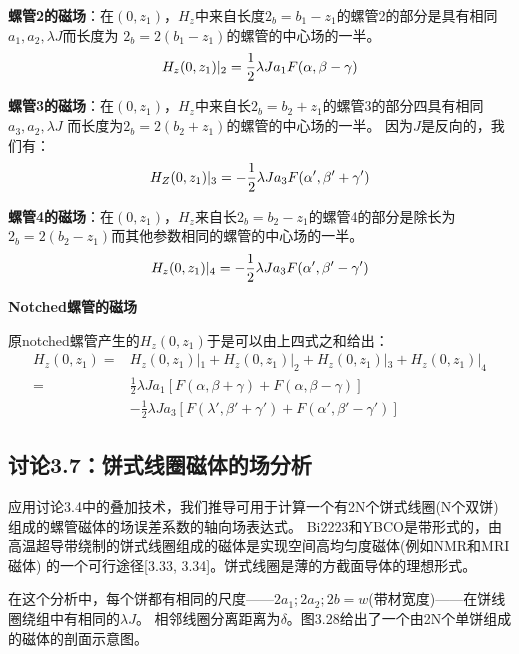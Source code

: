 \textbf{螺管2的磁场}：在$(0, z_1)$，$H_z$中来自长度$2_b = b_1−z_1$的螺管2的部分是具有相同$a_1, a_2,\lambda J$而长度为
$2_b = 2(b_1−z_1)$的螺管的中心场的一半。
\begin{equation}
H_{z}(0,z_{1})|_{2}=\frac{1}{2}\lambda Ja_{1}F(\alpha,\beta-\gamma)\\%
\end{equation}

\textbf{螺管3的磁场}：在$(0, z_1)$，$H_z$中来自长$2_b=b_2+z_1$的螺管3的部分四具有相同$a_3, a_2,\lambda J$
而长度为$2_b=2(b_2+z_1)$的螺管的中心场的一半。
因为$J$是反向的，我们有：
\begin{equation}
H_{Z}(0,z_{1})|_{3}=-\frac{1}{2}\lambda Ja_{3}F(\alpha',\beta'+\gamma')\\%
\end{equation}

\textbf{螺管4的磁场}：在$(0, z_1)$，$H_z$来自长$2_b = b_2−z_1$的螺管4的部分是除长为$2_b = 2(b_2−z_1)$而其他参数相同的螺管的中心场的一半。
\begin{equation}
H_{z}(0,z_{1})|_{4}=-\frac{1}{2}\lambda Ja_{3}F(\alpha',\beta'-\gamma')\\%
\end{equation}

\textbf{Notched螺管的磁场}

原notched螺管产生的$H_z(0,z_1)$于是可以由上四式之和给出：
\begin{equation}%
\begin{split}
 H_{z}(0,z_{1}) =&H_{z}(0,z_{1})|_{1}+H_{z}(0,z_{1})|_{2}+H_{z}(0,z_{1})|_{3}+H_{z}(0,z_{1})|_{4} \\
=&\frac{1}{2}\lambda J a_{1}[F(\alpha,\beta+\gamma)+F(\alpha,\beta-\gamma)] \\%
&-\frac{1}{2}\lambda J a_{3}[F(\lambda',\beta'+\gamma')+F(\alpha',\beta'-\gamma')]
\end{split}
\end{equation}
\newpage


\subsection{讨论3.7：饼式线圈磁体的场分析}
应用讨论3.4中的叠加技术，我们推导可用于计算一个有2N个饼式线圈(N个双饼)组成的螺管磁体的场误差系数的轴向场表达式。
Bi2223和YBCO是带形式的，由高温超导带绕制的饼式线圈组成的磁体是实现空间高均匀度磁体(例如NMR和MRI磁体)
的一个可行途径[3.33, 3.34]。饼式线圈是薄的方截面导体的理想形式。

在这个分析中，每个饼都有相同的尺度——$2a_1;2a_2;2b=w$(带材宽度)——在饼线圈绕组中有相同的$\lambda J$。
相邻线圈分离距离为$\delta$。图3.28给出了一个由2N个单饼组成的磁体的剖面示意图。

